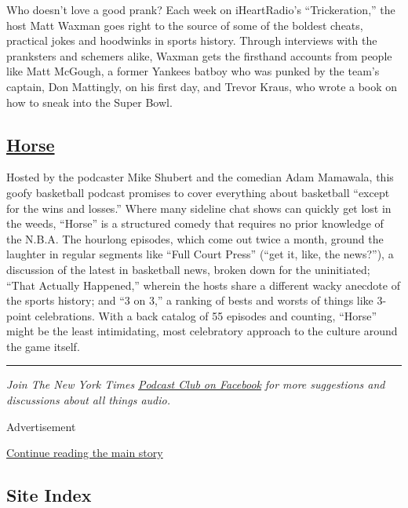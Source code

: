 Who doesn't love a good prank? Each week on iHeartRadio's
``Trickeration,'' the host Matt Waxman goes right to the source of some
of the boldest cheats, practical jokes and hoodwinks in sports history.
Through interviews with the pranksters and schemers alike, Waxman gets
the firsthand accounts from people like Matt McGough, a former Yankees
batboy who was punked by the team's captain, Don Mattingly, on his first
day, and Trevor Kraus, who wrote a book on how to sneak into the Super
Bowl.

\hypertarget{horse}{%
\subsection{\texorpdfstring{\href{https://www.horsehoops.com/}{Horse}}{Horse}}\label{horse}}

Hosted by the podcaster Mike Shubert and the comedian Adam Mamawala,
this goofy basketball podcast promises to cover everything about
basketball ``except for the wins and losses.'' Where many sideline chat
shows can quickly get lost in the weeds, ``Horse'' is a structured
comedy that requires no prior knowledge of the N.B.A. The hourlong
episodes, which come out twice a month, ground the laughter in regular
segments like ``Full Court Press'' (``get it, like, the news?''), a
discussion of the latest in basketball news, broken down for the
uninitiated; ``That Actually Happened,'' wherein the hosts share a
different wacky anecdote of the sports history; and ``3 on 3,'' a
ranking of bests and worsts of things like 3-point celebrations. With a
back catalog of 55 episodes and counting, ``Horse'' might be the least
intimidating, most celebratory approach to the culture around the game
itself.

\begin{center}\rule{0.5\linewidth}{\linethickness}\end{center}

\emph{Join The New York Times}
\href{https://www.facebook.com/groups/nytpodcastclub/}{\emph{Podcast
Club on Facebook}} \emph{for more suggestions and discussions about all
things audio.}

Advertisement

\protect\hyperlink{after-bottom}{Continue reading the main story}

\hypertarget{site-index}{%
\subsection{Site Index}\label{site-index}}

